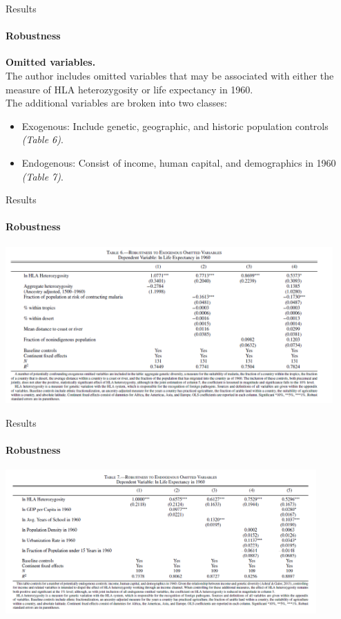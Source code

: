 \documentclass[pdftex,12pt,xcolor=pdftex,table]{beamer}
\theoremstyle{definition}
\theoremstyle{remark}
\numberwithin{equation}{section}
\numberwithin{figure}{section}
\begin{document}
\begin{frame}{Results}
\framesubtitle{Robustness}
\justifying
\textbf{Omitted variables.}\\
The author includes omitted variables that may be associated with either the measure of HLA heterozygosity or life expectancy in 1960.\\
\pause
The additional variables are broken into two classes:
\pause
\begin{itemize}
    \item Exogenous: Include genetic, geographic, and historic population controls \textit{(Table 6)}.
    \pause
    \item  Endogenous: Consist of income, human capital, and demographics in 1960 \textit{(Table 7)}.
\end{itemize}
\end{frame}

\begin{frame}{Results}
\framesubtitle{Robustness}
\includegraphics[height=6cm]{Table_6.PNG}
\end{frame}

\begin{frame}{Results}
\framesubtitle{Robustness}
\includegraphics[height=5.5cm]{Table_7.PNG}
\end{frame}
\end{document}
